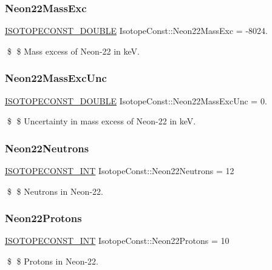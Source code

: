 \subsubsection{\texorpdfstring{Neon22\+Mass\+Exc}{Neon22MassExc}}
{\footnotesize\ttfamily \mbox{\hyperlink{group___isotope_const-_macros_ga8f45a7272ce02c0b4c65c44636ed719a}{I\+S\+O\+T\+O\+P\+E\+C\+O\+N\+S\+T\+\_\+\+D\+O\+U\+B\+LE}} Isotope\+Const\+::\+Neon22\+Mass\+Exc = -\/8024.}

\$ \$ Mass excess of Neon-\/22 in keV. \mbox{\label{group___isotope_const-_neon-_ne22_gaedf700c26d150aece31e50f68e93d60a}} 
\subsubsection{\texorpdfstring{Neon22\+Mass\+Exc\+Unc}{Neon22MassExcUnc}}
{\footnotesize\ttfamily \mbox{\hyperlink{group___isotope_const-_macros_ga8f45a7272ce02c0b4c65c44636ed719a}{I\+S\+O\+T\+O\+P\+E\+C\+O\+N\+S\+T\+\_\+\+D\+O\+U\+B\+LE}} Isotope\+Const\+::\+Neon22\+Mass\+Exc\+Unc = 0.}

\$ \$ Uncertainty in mass excess of Neon-\/22 in keV. \mbox{\label{group___isotope_const-_neon-_ne22_gae94c1d5c8656f7c2b9c4374ad8161a4c}} 
\subsubsection{\texorpdfstring{Neon22\+Neutrons}{Neon22Neutrons}}
{\footnotesize\ttfamily \mbox{\hyperlink{group___isotope_const-_macros_ga5f18360b3e99483a35c32d789e62621c}{I\+S\+O\+T\+O\+P\+E\+C\+O\+N\+S\+T\+\_\+\+I\+NT}} Isotope\+Const\+::\+Neon22\+Neutrons = 12}

\$ \$ Neutrons in Neon-\/22. \mbox{\label{group___isotope_const-_neon-_ne22_gafca29d9490e23b02346f62fdc1605b1d}} 
\subsubsection{\texorpdfstring{Neon22\+Protons}{Neon22Protons}}
{\footnotesize\ttfamily \mbox{\hyperlink{group___isotope_const-_macros_ga5f18360b3e99483a35c32d789e62621c}{I\+S\+O\+T\+O\+P\+E\+C\+O\+N\+S\+T\+\_\+\+I\+NT}} Isotope\+Const\+::\+Neon22\+Protons = 10}

\$ \$ Protons in Neon-\/22. 